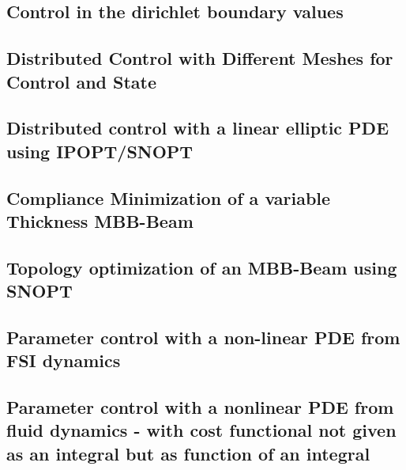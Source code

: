 \documentclass[a4paper,cleardoubleempty]{scrreprt}
\theoremstyle{plain}
\theoremstyle{remark}
\begin{document}
\subsection{Control in the dirichlet boundary values}
\label{OPT_Stat_Dirichlet_Boundary}

\clearpage
\subsection{Distributed Control with Different Meshes for Control and State}
\label{OPT_Stat_Distributed_MultiMesh}

\clearpage
\subsection{Distributed control with a linear elliptic PDE using IPOPT/SNOPT}
\label{OPT_Stat_Box_controlconstraints_SNOPT}

\clearpage
\subsection{Compliance Minimization of a variable Thickness MBB-Beam}
\label{OPT_Stat_MBB-Beam}

\clearpage
\subsection{Topology optimization of an MBB-Beam using SNOPT}
\label{OPT_Stat_TopOpt_MBB_SNOPT}

\clearpage
\subsection{Parameter control with a non-linear PDE from FSI dynamics}
\label{OPT_Stat_Param_Nonlin_FSI}

\clearpage
\subsection{Parameter control with a nonlinear PDE from fluid dynamics - with cost functional
not given as an integral but as function of an integral}
\label{OPT_Stat_Param_Nonlin_Fluid_extension}

\clearpage
\end{document}
